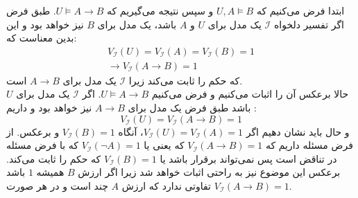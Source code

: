 \documentclass[]{exam}
\begin{document}
ابتدا فرض می‌کنیم که 
$U,A \models B$ و سپس نتیجه می‌گیریم که $U \models A \to B$.
طبق فرض اگر تفسیر دلخواه $\mathscr{I}$ یک مدل برای $U$ و $A$ باشد،
یک مدل برای $B$ نیز خواهد بود و این بدین معناست که:
\begin{align*}
    V_{\mathscr{I}}(U) = V_{\mathscr{I}}(A) = V_{\mathscr{I}}(B) = 1 \\
    \rightarrow V_{\mathscr{I}}(A \to B) = 1
\end{align*}
که حکم را ثابت می‌کند زیرا $\mathscr{I}$ یک مدل برای $A \to B$ است. \\
حالا برعکس آن را اثبات می‌کنیم و فرض می‌کنیم $U \models A \to B$.
اگر $\mathscr{I}$ یک مدل برای $U$ باشد طبق فرض یک مدل برای $A \to B$ نیز خواهد بود
و داریم :
$$V_{\mathscr{I}}(U) = V_{\mathscr{I}}(A \to B) = 1$$
و حال باید نشان دهیم اگر $V_{\mathscr{I}}(U) = V_{\mathscr{I}}(A) = 1$، 
آنگاه $V_{\mathscr{I}}(B) = 1$ و برعکس.
از فرض مسئله داریم که $V_{\mathscr{I}}(A \to B) = 1$ که یعنی
یا $V_{\mathscr{I}}(\neg A) = 1$ که با فرض مسئله در تناقض است پس نمی‌تواند برقرار باشد
یا $V_{\mathscr{I}}(B) = 1$ که حکم را ثابت می‌کند.
برعکس این موضوع نیز به راحتی اثبات خواهد شد زیرا اگر ارزش $B$ همیشه $1$ باشد
تفاوتی ندارد که ارزش $A$ چند است
و در هر صورت $V_{\mathscr{I}}(A \to B) = 1$.
\end{document}
